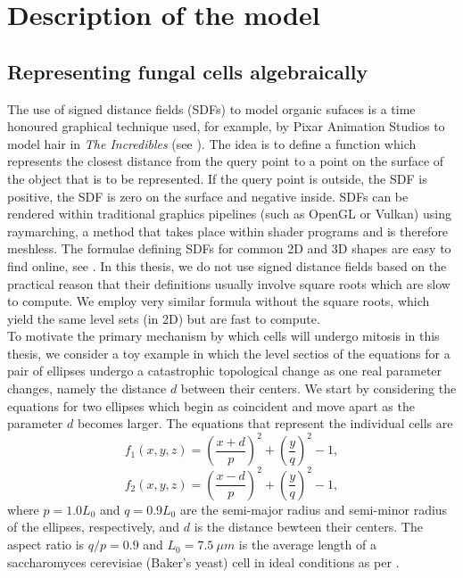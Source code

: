 \chapter{ Description of the model \label{ch:numero_uno}}
\section{Representing fungal cells algebraically}\label{sec:introSDFs}
The use of signed distance fields (SDFs) to model organic sufaces
is a time honoured graphical technique used, for example, by Pixar
Animation Studios to model hair in \textit{The Incredibles} 
(see \cite{petrovic2005volumetric}). The idea is to define a 
function which represents the closest distance from the query point
to a point on the surface of the object that is to be represented. 
If the query point is outside, the SDF is positive,
the SDF is zero on the surface and negative inside. SDFs can be 
rendered within traditional graphics pipelines (such as OpenGL or Vulkan)
using raymarching, a method that takes place within shader programs and 
is therefore meshless. The formulae defining SDFs for common 2D and 3D 
shapes are easy to find online, see \cite{key}. In this thesis,
we do not use signed distance fields based on the practical 
reason that their definitions usually involve square roots
which are slow to compute. We employ very similar formula
without the square roots, which yield the same level sets (in 2D)
but are fast to compute.
\\

To motivate the primary mechanism by which cells will undergo mitosis 
in this thesis, we consider a toy example in which the level sectios of the equations for
a pair of ellipses undergo a catastrophic topological change as one real parameter 
changes, namely the distance $d$ between their centers. We start by considering 
the equations for two ellipses which 
begin as coincident and move apart as the parameter $d$ becomes larger. 
The equations that represent the individual cells are
\begin{equation*}
    f_1(x,y,z) = \left( \frac{x+d}{p} \right)^2 + \left( \frac{y}{q} \right)^2 - 1,
\end{equation*}
\begin{equation*}
    f_2(x,y,z) = \left( \frac{x-d}{p} \right)^2 + \left( \frac{y}{q} \right)^2 - 1,
\end{equation*}
where $p=1.0 L_0$ and $q=0.9 L_0$ are the semi-major radius and semi-minor radius
of the ellipses, respectively, 
and $d$ is the distance bewteen their centers. The aspect ratio is $q/p = 0.9$ and $L_0 = 7.5 \ \mu m$
is the average length of a  saccharomyces cerevisiae (Baker's yeast) cell in ideal conditions as per
\cite{chavez2024cell}.
\\


